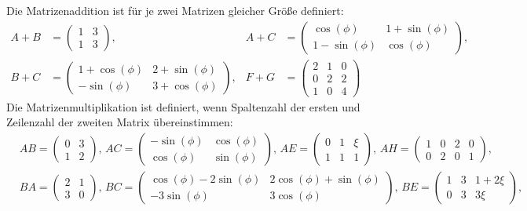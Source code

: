 \documentclass[11pt]{exam}
\begin{document}
\begin{questions}
\begin{solution}
	Die Matrizenaddition ist für je zwei Matrizen gleicher Größe definiert:
	\begin{align*}
		A+B&=\left(\begin{array}{cc}1&3\\1&3\end{array}\right),& A+C&=\left(\begin{array}{cc}\cos(\phi)&1+\sin(\phi)\\1-\sin(\phi)&\cos(\phi)\end{array}\right),\\
		B+C&=\left(\begin{array}{cc}1+\cos(\phi)&2+\sin(\phi)\\-\sin(\phi)&3+\cos(\phi)\end{array}\right),&
		F+G&=\left(\begin{array}{ccc}2&1&0\\0&2&2\\1&0&4\end{array}\right)
	\end{align*}
	Die Matrizenmultiplikation ist definiert, wenn Spaltenzahl der ersten und Zeilenzahl der zweiten Matrix übereinstimmen:
	\begin{align*}
		&AB=\left(\begin{array}{cc}0&3\\1&2\end{array}\right),\,
		AC=\left(\begin{array}{cc}-\sin(\phi)&\cos(\phi)\\\cos(\phi)&\sin(\phi)\end{array}\right),\,
		AE=\left(\begin{array}{ccc}0&1&\xi\\1&1&1\end{array}\right),\,
		AH=\left(\begin{array}{cccc}1&0&2&0\\0&2&0&1\end{array}\right),\\
		&BA=\left(\begin{array}{cc}2&1\\3&0\end{array}\right),\,
		BC=\left(\begin{array}{cc}\cos(\phi)-2\sin(\phi)&2\cos(\phi)+\sin(\phi)\\-3\sin(\phi)&3\cos(\phi)\end{array}\right),\,
		BE=\left(\begin{array}{ccc}1&3&1+2\xi\\0&3&3\xi\end{array}\right),\\

\end{align*}
\end{solution}
\end{questions}
\end{document}

